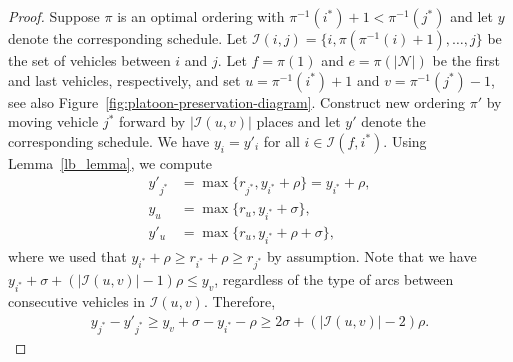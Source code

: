 \documentclass[a4paper]{article}
\theoremstyle{definition}
\theoremstyle{plain}
\begin{document}
\begin{proof}
  Suppose $\pi$ is an optimal ordering with $\pi^{-1}(i^{*}) + 1 < \pi^{-1}(j^{*})$
  and let $y$ denote the corresponding schedule.
  Let
  $\mathcal{I}(i,j) = \{ i, \pi(\pi^{-1}(i) + 1), \dots, j \}$
  be the set of vehicles between $i$ and $j$.
  Let $f = \pi(1)$ and $e = \pi(|\mathcal{N}|)$ be the first and last vehicles,
  respectively, and set $u = \pi^{-1}(i^{*}) + 1$ and $v = \pi^{-1}(j^{*}) - 1$, see also Figure~\ref{fig:platoon-preservation-diagram}.
  Construct new ordering $\pi'$ by moving vehicle $j^{*}$ forward
  by $|\mathcal{I}(u,v)|$ places and let $y'$ denote the corresponding schedule.
  We have $y_{i} = y'_{i}$ for all $i \in \mathcal{I}(f, i^{*})$.
  Using Lemma~\ref{lb_lemma}, we compute
  \begin{align*}
    y'_{j^{*}} &= \max \{ r_{j^{*}}, y_{i^{*}} + \rho \} = y_{i^{*}} + \rho , \\
    y_{u} &= \max \{ r_{u}, y_{i^{*}} + \sigma \} , \\
    y'_{u} &= \max \{ r_{u}, y_{i^{*}} + \rho + \sigma \} ,
  \end{align*}
  where we used that $y_{i^{*}} + \rho \geq r_{i^{*}} + \rho \geq r_{j^{*}}$ by assumption.
  Note that we have
  $y_{i^{*}} + \sigma + (|\mathcal{I}(u,v)| - 1) \rho \leq y_{v}$, regardless of the
  type of arcs between consecutive vehicles in $\mathcal{I}(u,v)$. Therefore,
  \begin{align*}
    y_{j^{*}} - y'_{j^{*}} \geq y_{v} + \sigma - y_{i^{*}} - \rho \geq 2 \sigma + (|\mathcal{I}(u,v)| - 2) \rho .
  \end{align*}


\end{proof}
\end{document}
